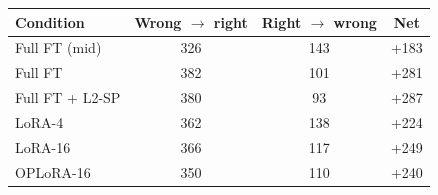 \begin{tabular}{lccc}
\toprule
Condition & Wrong $\to$ right & Right $\to$ wrong & Net \\
\midrule
Full FT (mid) & 326 & 143 & +183 \\
Full FT & 382 & 101 & +281 \\
Full FT + L2-SP & 380 & 93 & +287 \\
LoRA-4 & 362 & 138 & +224 \\
LoRA-16 & 366 & 117 & +249 \\
OPLoRA-16 & 350 & 110 & +240 \\
\bottomrule
\end{tabular}